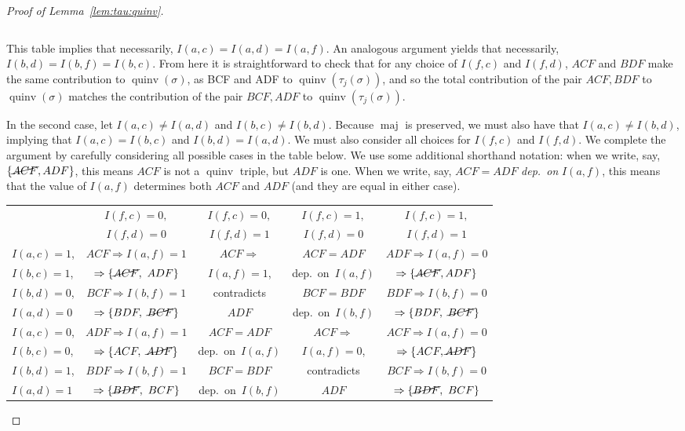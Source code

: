 \documentclass[11pt]{article}
\theoremstyle{definition}
\numberwithin{equation}{section}
\DeclareMathOperator{\maj}{maj}
\DeclareMathOperator{\quinv}{quinv}
\begin{document}
\begin{proof}[Proof of Lemma~\ref{lem:tau:quinv}]
\begin{center}
{\begin{tabular}{l|c|c|}
\end{tabular}
}
\end{center}
 
This table implies that necessarily, $I(a,c)=I(a,d)=I(a,f)$.
An analogous argument yields that necessarily, $I(b,d)=I(b,f)=I(b,c)$. From here it is straightforward to check that for any choice of $I(f,c)$ and $I(f,d)$, $ACF$ and $BDF$ make the same contribution to $\quinv(\sigma)$, as BCF and ADF to $\quinv(\tau_j(\sigma))$, and so the total contribution of the pair $ACF, BDF$ to $\quinv(\sigma)$ matches the contribution of the pair $BCF, ADF$ to $\quinv(\tau_j(\sigma))$.  

In the second case, let $I(a,c)\neq I(a,d)$ and $I(b,c)\neq I(b,d)$. Because $\maj$ is preserved, we must also have that $I(a,c)\neq I(b,d)$, implying that $I(a,c)=I(b,c)$ and $I(b,d)=I(a,d)$. We must also consider all choices for $I(f,c)$ and $I(f,d)$. We complete the argument by carefully considering all possible cases in the table below. We use some additional shorthand notation: when we write, say, $\{\cancel{ACF}, ADF\}$, this means $ACF$ is not a $\quinv$ triple, but $ADF$ is one. When we write, say, $ACF=ADF$ \emph{dep.~on} $I(a,f)$, this means that the value of $I(a,f)$ determines both $ACF$ and $ADF$ (and they are equal in either case).

{\renewcommand{\arraystretch}{1.2}
\flushleft
\footnotesize
\begin{tabular}{l|c|c|c|c|}
& $I(f,c)=0,$ & $I(f,c)=0,$ & $I(f,c)=1,$ & $I(f,c)=1,$\\ 
& $I(f,d)=0$ & $I(f,d)=1$ & $I(f,d)=0$ & $I(f,d)=1$\\ \hline
$I(a,c)=1$, & $ACF \Rightarrow I(a,f)=1$ & $ACF \Rightarrow$ & $ACF=ADF$ & $ADF \Rightarrow I(a,f)=0$  \\
$I(b,c)=1$,& $\Rightarrow\{\cancel{ACF},\ ADF\}$ & $I(a,f)=1$, &dep.~on~$I(a,f)$ & $\Rightarrow\{\cancel{ACF}, ADF\}$  \\
$I(b,d)=0$, & $BCF \Rightarrow I(b,f)=1$ & contradicts & $BCF=BDF$  & $BDF \Rightarrow I(b,f)=0$  \\ 
$I(a,d)=0$& $\Rightarrow \{BDF,\ \cancel{BCF}\}$ & $ADF$ &dep.~on~$I(b,f)$ & $\Rightarrow \{BDF,\ \cancel{BCF}\}$  \\\hline
$I(a,c)=0$, & $ADF \Rightarrow I(a,f)=1$ & $ACF=ADF$ & $ACF \Rightarrow$ & $ACF \Rightarrow I(a,f)=0$  \\
$I(b,c)=0$,& $\Rightarrow \{ACF,\ \cancel{ADF}\}$ &dep.~on~$I(a,f)$ & $I(a,f)=0$, & $\Rightarrow \{ACF, \cancel{ADF}\}$  \\
$I(b,d)=1$, & $BDF \Rightarrow I(b,f)=1$ & $BCF=BDF$ & contradicts  & $BCF \Rightarrow I(b,f)=0$  \\ 
$I(a,d)=1$& $\Rightarrow\{\cancel{BDF},\ BCF\}$ &dep.~on~$I(b,f)$ & 
$ADF$ & $\Rightarrow\{\cancel{BDF},\ BCF\}$  \\\hline
\end{tabular}
}


\end{proof}
\end{document}
